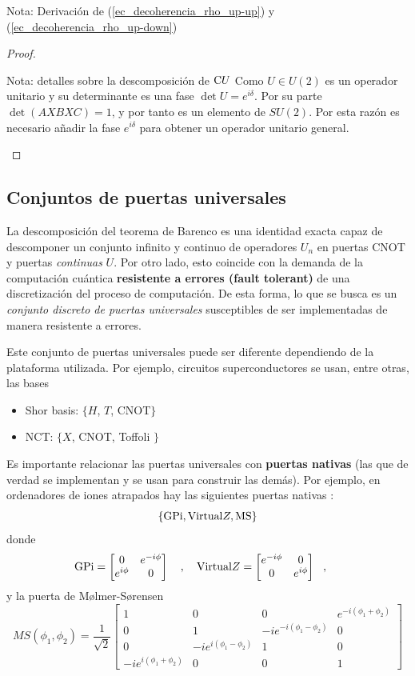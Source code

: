 \documentclass[a4paper,11pt]{book} %
\numberwithin{equation}{chapter}
\newcommand{\cg}[1]{{\rm C}#1}
\begin{document}
\begin{mybox_blue}{Nota: Derivación de (\ref{ec_decoherencia_rho_up-up}) y  (\ref{ec_decoherencia_rho_up-down})}
\begin{proof}
\begin{enumerate}
\begin{mybox_blue}{Nota: detalles sobre la descomposición de $\cg {U}$}
		Como $U\in U(2)$  es un operador unitario y  su determinante es una fase $\det U = e^{i\delta}$. Por su parte 
		$\det(AXBXC) = 1$, y por tanto es un elemento de $SU(2)$.  Por esta razón es necesario añadir la fase $e^{i\delta}$ 
		para obtener un operador unitario general. 
		\end{mybox_blue}		
		
	\end{enumerate}
	\end{proof}


        \subsection{Conjuntos de puertas universales}

La descomposición del teorema de Barenco es  una identidad exacta capaz de descomponer un conjunto infinito y continuo de operadores $U_n$ en puertas CNOT y puertas \textit{continuas} $U$. Por otro lado, esto coincide con la demanda de la computación cuántica \textbf{resistente a errores (fault tolerant)} de una discretización del proceso de computación. De esta forma, lo que se busca es un \textit{conjunto discreto de puertas universales} susceptibles de ser implementadas de manera resistente a errores.

Este conjunto de puertas universales puede ser diferente dependiendo de la plataforma utilizada. Por ejemplo, circuitos superconductores se usan, entre otras, las bases
	\begin{itemize}
		\item Shor basis: $\{ H$, $T$, CNOT$ \}$
		\item NCT: $\{ X$, CNOT, Toffoli $\}$
	\end{itemize}

Es importante relacionar las puertas universales con \textbf{puertas nativas} (las que de verdad se implementan y se usan para construir las demás). Por ejemplo, en ordenadores de iones atrapados hay las siguientes puertas nativas \cite{IONQ}:
$$
\{ \hbox{GPi},\hbox{Virtual}Z, \hbox{MS}\} 
$$
donde 
$$
\hbox{GPi} = \begin{bmatrix} 0 & e^{-i\phi} \\e^{i\phi} & 0 \end{bmatrix}~~~,~~~
\hbox{Virtual}Z = \begin{bmatrix} e^{-i\phi} & 0 \\ 0 & e^{i\phi} \end{bmatrix} ~~,~~~~
$$
y la puerta de Mølmer-Sørensen
$$
MS(\phi_1,\phi_2) = \frac{1}{\sqrt{2}}
\begin{bmatrix}
1 & 0 & 0 & e^{-i(\phi_1+\phi_2)} \\ 0 & 1 &-i e^{-i(\phi_1-\phi_2)} & 0 \\ 0 & -i e^{i(\phi_1-\phi_2)} & 1 & 0  \\ 
-ie^{i(\phi_1+\phi_2)} & 0 & 0 & 1 
\end{bmatrix}
$$


\end{mybox_blue}
\end{document}
